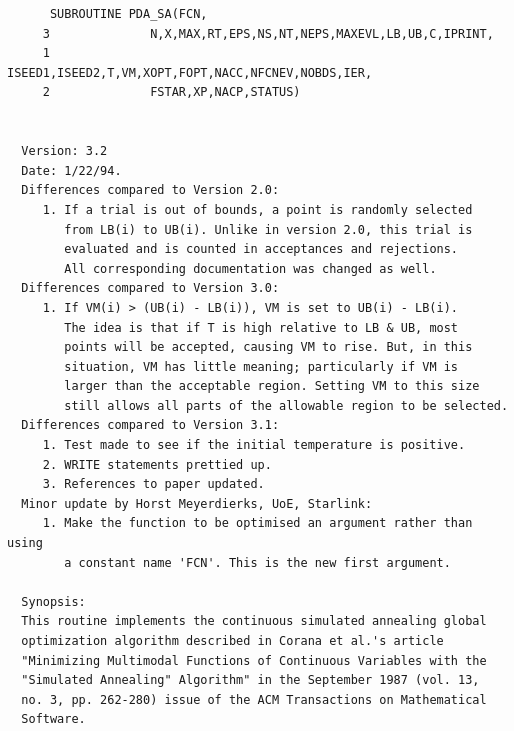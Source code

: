 \documentclass[11pt,twoside]{article}
\begin{document}
\begin{verbatim}
      SUBROUTINE PDA_SA(FCN,
     3              N,X,MAX,RT,EPS,NS,NT,NEPS,MAXEVL,LB,UB,C,IPRINT,
     1              ISEED1,ISEED2,T,VM,XOPT,FOPT,NACC,NFCNEV,NOBDS,IER,
     2              FSTAR,XP,NACP,STATUS)


  Version: 3.2
  Date: 1/22/94.
  Differences compared to Version 2.0:
     1. If a trial is out of bounds, a point is randomly selected
        from LB(i) to UB(i). Unlike in version 2.0, this trial is
        evaluated and is counted in acceptances and rejections.
        All corresponding documentation was changed as well.
  Differences compared to Version 3.0:
     1. If VM(i) > (UB(i) - LB(i)), VM is set to UB(i) - LB(i).
        The idea is that if T is high relative to LB & UB, most
        points will be accepted, causing VM to rise. But, in this
        situation, VM has little meaning; particularly if VM is
        larger than the acceptable region. Setting VM to this size
        still allows all parts of the allowable region to be selected.
  Differences compared to Version 3.1:
     1. Test made to see if the initial temperature is positive.
     2. WRITE statements prettied up.
     3. References to paper updated.
  Minor update by Horst Meyerdierks, UoE, Starlink:
     1. Make the function to be optimised an argument rather than using
        a constant name 'FCN'. This is the new first argument.

  Synopsis:
  This routine implements the continuous simulated annealing global
  optimization algorithm described in Corana et al.'s article
  "Minimizing Multimodal Functions of Continuous Variables with the
  "Simulated Annealing" Algorithm" in the September 1987 (vol. 13,
  no. 3, pp. 262-280) issue of the ACM Transactions on Mathematical
  Software.


\end{verbatim}
\end{document}
